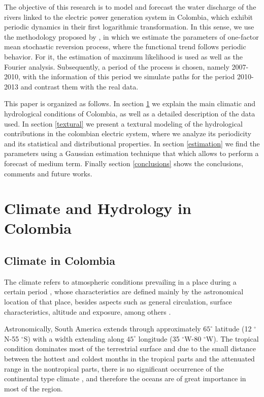 \documentclass[12pt,halfline,a4paper]{ouparticle}
\begin{document}
The objective of this research is to model and forecast the water discharge of the rivers linked to the electric power generation system in Colombia, which exhibit periodic dynamics in their first logarithmic transformation. In this sense, we use the methodology proposed by \cite{Monsalve2017}, in which we estimate the parameters of one-factor mean stochastic reversion process, where the functional trend follows periodic behavior. For it, the estimation of maximum likelihood is used as well as the Fourier analysis. Subsequently, a period of the process is chosen, namely 2007-2010, with the information of this period we simulate paths for the period 2010-2013 and contrast them with the real data. 

This paper is organized as follows. In section \ref{climate} we explain the main climatic and hydrological conditions of Colombia, as well as a detailed description of the data used. In section \ref{textural} we present a textural modeling of the hydrological contributions in the colombian electric system, where we analyze its periodicity and its statistical and distributional properties. In section \ref{estimation} we find the parameters using a Gaussian estimation technique that which allows to perform a forecast of medium term. Finally section \ref{conclusions} shows the conclusions, comments and future works.  

\section{Climate and Hydrology in Colombia}\label{climate}

\subsection{Climate in Colombia}

The climate refers to atmospheric conditions prevailing in a place during a certain period \citep{Pabon-Caicedo2001}, whose characteristics are defined mainly by the astronomical location of that place, besides aspects such as general circulation, surface characteristics, altitude and exposure, among others \citep{Koppen1930}.

Astronomically, South America extends through approximately $65^{\circ}$ latitude (12 $^{\circ}$N-55 $^{\circ}$S) with a width extending along $45^{\circ}$ longitude (35 $^{\circ}$W-80 $^{\circ}$W). The tropical condition dominates most of the terrestrial surface and due to the small distance between the hottest and coldest months in the tropical parts and the attenuated range in the nontropical parts, there is no significant occurrence of the continental type climate \citep{Eidt1969}, and therefore the oceans are of great importance in most of the region.
\end{document}

